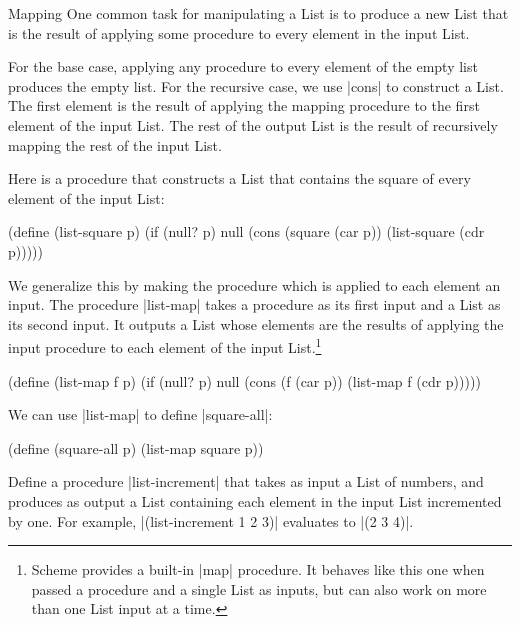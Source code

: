 \begin{schemeregion}
\begin{examplenobar}{Mapping}\label{example:map} One common task for manipulating a List is to produce a new List that is the result of applying some procedure to every element in the input List.  

For the base case, applying any procedure to every element of the empty list produces the empty list.  For the recursive case, we use \scheme|cons| to construct a List.  The first element is the result of applying the mapping procedure to the first element of the input List.  The rest of the output List is the result of recursively mapping the rest of the input List.

Here is a procedure that constructs a List that contains the square of every element of the input List:

\begin{schemedisplay}
(define (list-square p)
  (if (null? p) null
      (cons (square (car p)) 
            (list-square (cdr p)))))
\end{schemedisplay}

We generalize this by making the procedure which is applied to each element an input.  The procedure \scheme|list-map| takes a procedure as its first input and a List as its second input.  It outputs a List whose elements are the results of applying the input procedure to each element of the input List.\footnote{Scheme provides a built-in \scheme|map| procedure.  It behaves like this one when passed a procedure and a single List as inputs, but can also work on more than one List input at a time.}

\begin{schemedisplay}
(define (list-map f p)
  (if (null? p) null
      (cons (f (car p)) 
            (list-map f (cdr p)))))
\end{schemedisplay}

We can use \scheme|list-map| to define \scheme|square-all|:
\begin{schemedisplay}
(define (square-all p) (list-map square p))
\end{schemedisplay}

\beforeex
\begin{exercise}
Define a procedure \scheme|list-increment| that takes as input a List of numbers, and produces as output a List containing each element in the input List incremented by one.  For example, \scheme|(list-increment 1 2 3)| evaluates to \schemeresult|(2 3 4)|.
\solution{\LATER{}}
\end{exercise}
\afterex


\end{examplenobar}
\end{schemeregion}
